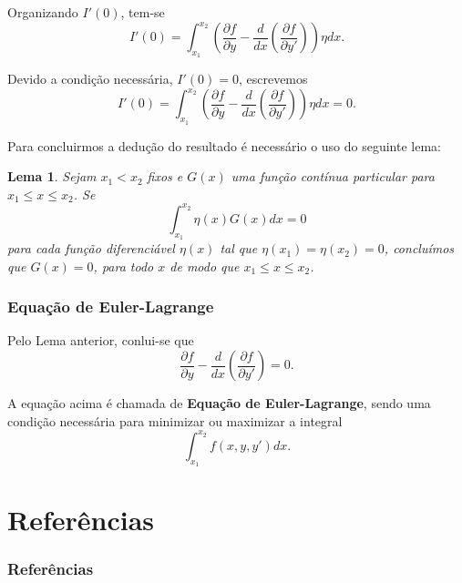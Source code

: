\documentclass{beamer}
\newtheorem{lema}{Lema}
\begin{document}
\begin{frame}
	\justify
	
	Organizando $I'(0)$, tem-se
	$$
		I'(0)=\int_{x_1}^{x_2}\left (
			\frac{\partial f}{\partial y} -
			\frac{d}{dx}
			\left (
				\frac{\partial f}{\partial y'}
			\right )
		\right )\eta dx
		\text{.}
	$$
	\pause
	
	Devido a condição necessária, $I'(0)=0$, escrevemos
	$$
		I'(0)=\int_{x_1}^{x_2}\left (
			\frac{\partial f}{\partial y} -
			\frac{d}{dx}
			\left (
				\frac{\partial f}{\partial y'}
			\right )
		\right )\eta dx = 0
		\text{.}
	$$
\end{frame}

\begin{frame}
	\justify
	Para concluirmos a dedução do resultado é necessário o uso do seguinte lema:
	
	\begin{lema}
		\justify
		Sejam $x_1 < x_2$ fixos e $G(x)$ uma função contínua particular para $x_1 \leqslant x \leqslant x_2$. Se $$\int_{x_1}^{x_2} \eta (x) G(x) dx = 0$$ para cada função diferenciável $\eta (x)$ tal que $\eta (x_1)=\eta (x_2)=0$, concluímos que $G(x)=0$, para todo $x$ de modo que $x_1 \leqslant x \leqslant x_2$.
	\end{lema}	
	
\end{frame}

\begin{frame}
	\frametitle{Equação de Euler-Lagrange}
	\justify
	
	Pelo Lema anterior, conlui-se que
	$$
		\frac{\partial f}{\partial y} - \frac{d}{dx} \left ( \frac{\partial f}{\partial y'} \right )=0 \text{.}
	$$
	\pause
	
	A equação acima é chamada de \textbf{Equação de Euler-Lagrange}, sendo uma condição necessária para minimizar ou maximizar a integral
	$$
		\int_{x_1}^{x_2} f(x, y, y')dx \text{.}
	$$
\end{frame}

\section{Referências}
\begin{frame}
	\frametitle{Referências}
	
\end{frame}
\end{document}
